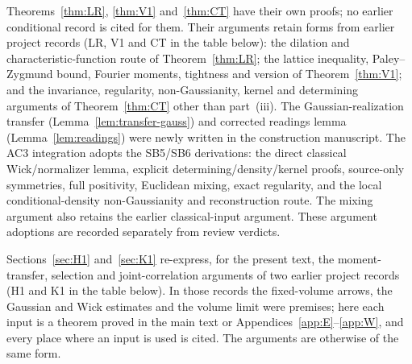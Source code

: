 \documentclass[11pt]{article}
\theoremstyle{plain}
\theoremstyle{definition}
\theoremstyle{remark}
\begin{document}
Theorems~\ref{thm:LR}, \ref{thm:V1} and~\ref{thm:CT} have their own proofs; no
earlier conditional record is cited for them. Their arguments retain forms from
earlier project records (LR, V1 and CT in the table below):
the dilation and characteristic-function route of Theorem~\ref{thm:LR}; the lattice
inequality, Paley--Zygmund bound, Fourier moments, tightness and version of
Theorem~\ref{thm:V1}; and the invariance, regularity, non-Gaussianity, kernel and
determining arguments of Theorem~\ref{thm:CT} other than part~(iii). The
Gaussian-realization transfer (Lemma~\ref{lem:transfer-gauss}) and corrected
readings lemma (Lemma~\ref{lem:readings}) were newly written in the construction manuscript.
The AC3 integration adopts the SB5/SB6 derivations: the direct
classical Wick/normalizer lemma, explicit determining/density/kernel proofs,
source-only symmetries, full positivity, Euclidean mixing, exact regularity,
and the local conditional-density non-Gaussianity and reconstruction route.
The mixing argument also retains the earlier classical-input argument.
These argument adoptions are recorded separately from review verdicts.

Sections~\ref{sec:H1} and~\ref{sec:K1} re-express, for the present text, the
moment-transfer, selection and joint-correlation arguments of two earlier project
records (H1 and K1 in the table below). In those records the fixed-volume arrows,
the Gaussian and Wick estimates and the volume limit were premises; here each
input is a theorem proved in the main text or Appendices~\ref{app:E}--\ref{app:W},
and every place where an input is used is cited. The arguments are otherwise of
the same form.

\clearpage
\end{document}
